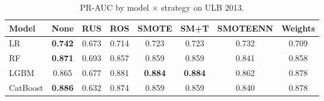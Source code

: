 \begin{table}[ht]
\centering
\caption{PR-AUC by model $\times$ strategy on ULB 2013.}
\label{tab:factorial_ulb_prauc}
\begin{tabular}{l c c c c c c c}
\toprule
Model & None & RUS & ROS & SMOTE & SM+T & SMOTEENN & Weights \\
\midrule
LR         & \textbf{0.742} & 0.673 & 0.714 & 0.723 & 0.723 & 0.732 & 0.709 \\
RF         & \textbf{0.871} & 0.693 & 0.857 & 0.859 & 0.859 & 0.841 & 0.858 \\
LGBM       & 0.865 & 0.677 & 0.881 & \textbf{0.884} & \textbf{0.884} & 0.862 & 0.878 \\
CatBoost   & \textbf{0.886} & 0.632 & 0.874 & 0.859 & 0.859 & 0.840 & 0.878 \\
\bottomrule
\end{tabular}
\end{table}